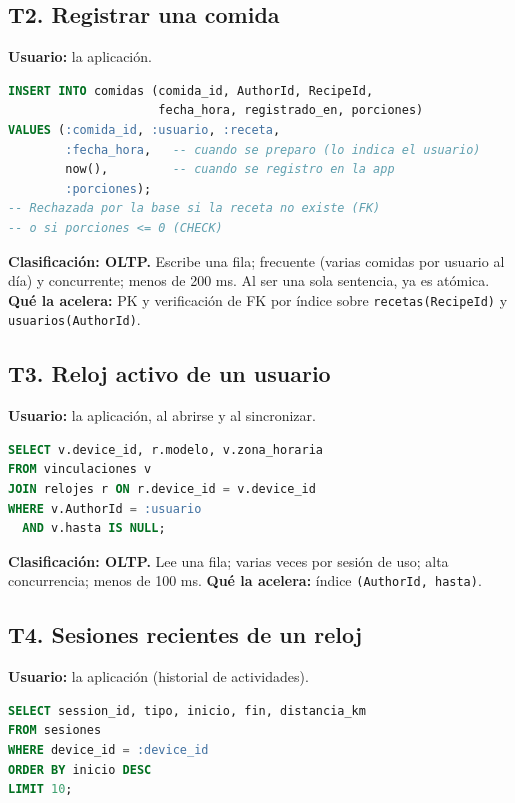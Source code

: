 \documentclass[11pt]{article}
\newcommand{\codigo}[1]{\texttt{\small #1}}
\begin{document}
\subsection{T2. Registrar una comida}

\textbf{Usuario:} la aplicación.

\begin{lstlisting}[language=SQL]
INSERT INTO comidas (comida_id, AuthorId, RecipeId,
                     fecha_hora, registrado_en, porciones)
VALUES (:comida_id, :usuario, :receta,
        :fecha_hora,   -- cuando se preparo (lo indica el usuario)
        now(),         -- cuando se registro en la app
        :porciones);
-- Rechazada por la base si la receta no existe (FK)
-- o si porciones <= 0 (CHECK)
\end{lstlisting}

\textbf{Clasificación: OLTP.} Escribe una fila; frecuente (varias
comidas por usuario al día) y concurrente; menos de 200 ms. Al ser una
sola sentencia, ya es atómica. \textbf{Qué la acelera:} PK y
verificación de FK por índice sobre \codigo{recetas(RecipeId)} y
\codigo{usuarios(AuthorId)}.

\subsection{T3. Reloj activo de un usuario}

\textbf{Usuario:} la aplicación, al abrirse y al sincronizar.

\begin{lstlisting}[language=SQL]
SELECT v.device_id, r.modelo, v.zona_horaria
FROM vinculaciones v
JOIN relojes r ON r.device_id = v.device_id
WHERE v.AuthorId = :usuario
  AND v.hasta IS NULL;
\end{lstlisting}

\textbf{Clasificación: OLTP.} Lee una fila; varias veces por sesión
de uso; alta concurrencia; menos de 100 ms. \textbf{Qué la acelera:}
índice \codigo{(AuthorId, hasta)}.

\subsection{T4. Sesiones recientes de un reloj}

\textbf{Usuario:} la aplicación (historial de actividades).

\begin{lstlisting}[language=SQL]
SELECT session_id, tipo, inicio, fin, distancia_km
FROM sesiones
WHERE device_id = :device_id
ORDER BY inicio DESC
LIMIT 10;
\end{lstlisting}
\end{document}
